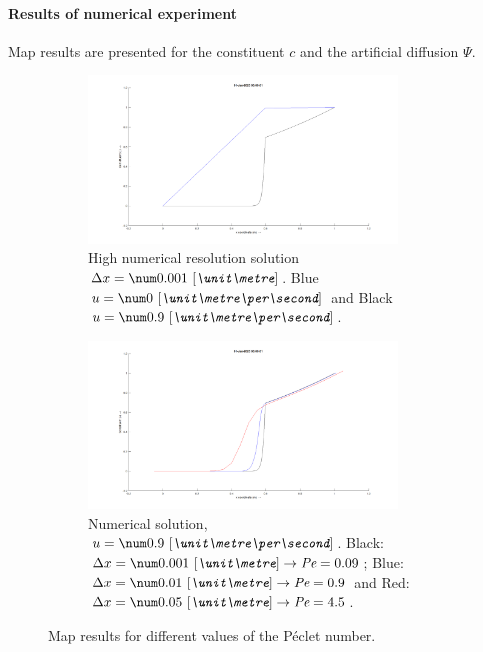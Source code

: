 \paragraph*{Results of numerical experiment}
Map results are presented for the constituent $c$ and the artificial diffusion $\Psi$.
\begin{figure}[H]
    \begin{subfigure}[t]{0.5\textwidth}
        \centering
        \includegraphics[width=0.9\textwidth]{figures/interface_u0d0_u0d9.png}
        \caption{High numerical resolution solution $\Dx=\bqty{0.001}{\metre}$.  Blue $u =\bqty{0}{\metre\per\second}$ and Black $u = \bqty{0.9}{\metre\per\second}$.}
    \end{subfigure}
    \hfill
    \begin{subfigure}[t]{0.5\textwidth}
        \centering
        \includegraphics[width=0.9\textwidth]{figures/interface_pe0d09_pe0d9_pe4d5.png}
        \caption{Numerical solution, $u = \bqty{0.9}{\metre\per\second}$. Black: $\Dx = \bqty{0.001}{\metre} \rightarrow \Pe= 0.09$; Blue: $\Dx = \bqty{0.01}{\metre} \rightarrow \Pe = 0.9$ and Red: $\Dx = \bqty{0.05}{\metre} \rightarrow \Pe = 4.5$.}
    \end{subfigure}
    \caption{Map results for different values of the P\'eclet number.}
\end{figure}
